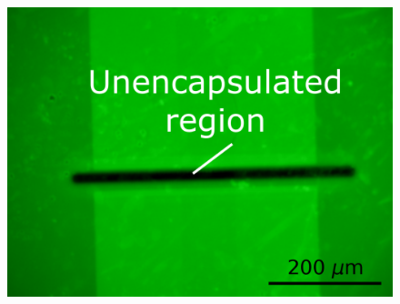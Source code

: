 \documentclass[
  a4paper,
]{scrbook}
\begin{document}
\begin{figure}
\begin{minipage}[t]{0.47\linewidth}
{{\includegraphics{figures/ch7/modified_CNT20_1mMPPF_channel8_350ms_12.6X_221124.png}

}

}

\subcaption{\label{fig-350ms-SU8-FITC}}
\end{minipage}%
\newline
\begin{minipage}[t]{0.47\linewidth}

{\centering 

}
\end{minipage}
\end{figure}
\end{document}
